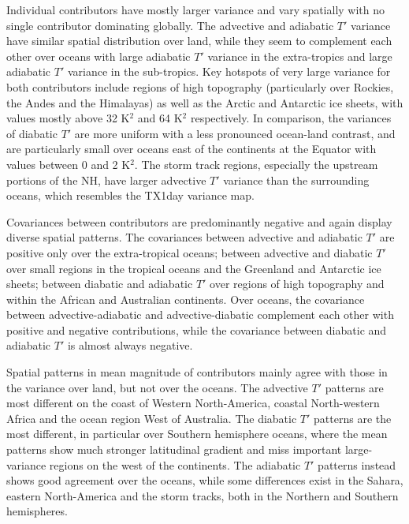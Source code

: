 \documentclass[11pt,a4paper,twoside,openright]{report}
\theoremstyle{definition}
\begin{document}
Individual contributors have mostly larger variance and vary spatially with no single contributor dominating globally. The advective and adiabatic \(T'\) variance have similar spatial distribution over land, while they seem to complement each other over oceans with large adiabatic \(T'\) variance in the extra-tropics and large adiabatic \(T'\) variance in the sub-tropics. Key hotspots of very large variance for both contributors include regions of high topography (particularly over Rockies, the Andes and the Himalayas) as well as the Arctic and Antarctic ice sheets, with values mostly above 32 K\(^2\) and 64 K\(^2\) respectively. In comparison, the variances of diabatic \(T'\) are more uniform with a less pronounced ocean-land contrast, and are particularly small over oceans east of the continents at the Equator with values between 0 and 2 K\(^2\). The storm track regions, especially the upstream portions of the NH, have larger advective \(T'\) variance than the surrounding oceans, which resembles the TX1day variance map.

Covariances between contributors are predominantly negative and again display diverse spatial patterns. The covariances between advective and adiabatic \(T'\) are positive only over the extra-tropical oceans; between advective and diabatic \(T'\) over small regions in the tropical oceans and the Greenland and Antarctic ice sheets; between diabatic and adiabatic \(T'\) over regions of high topography and within the African and Australian continents. Over oceans, the covariance between advective-adiabatic and advective-diabatic complement each other with positive and negative contributions, while the covariance between diabatic and adiabatic \(T'\) is almost always negative.

Spatial patterns in mean magnitude of contributors mainly agree with those in the variance over land, but not over the oceans. The advective \(T'\) patterns are most different on the coast of Western North-America, coastal North-western Africa and the ocean region West of Australia. The diabatic \(T'\) patterns are the most different, in particular over Southern hemisphere oceans, where the mean patterns show much stronger latitudinal gradient and miss important large-variance regions on the west of the continents. The adiabatic \(T'\) patterns instead shows good agreement over the oceans, while some differences exist in the Sahara, eastern North-America and the storm tracks, both in the Northern and Southern hemispheres.
\end{document}
